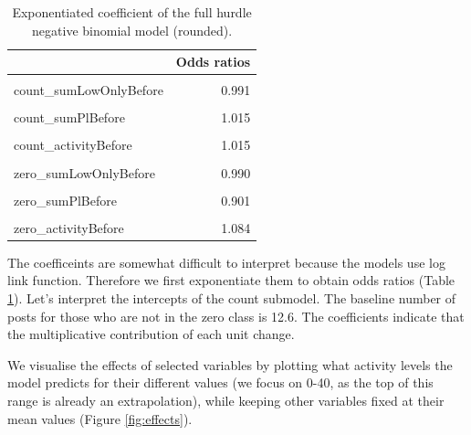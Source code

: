 \documentclass[10pt,dvipsnames]{scrartcl}
\begin{document}
\begin{table}[H]

\begin{table}[H]
\centering\begingroup\fontsize{9}{11}\selectfont

\begin{tabular}{lr}
\toprule
  & Odds ratios\\
\midrule
\cellcolor{gray!6}{count\_(Intercept)} & \cellcolor{gray!6}{12.606}\\
count\_sumLowOnlyBefore & 0.991\\
\cellcolor{gray!6}{count\_sumHighBefore} & \cellcolor{gray!6}{0.992}\\
count\_sumPlBefore & 1.015\\
\cellcolor{gray!6}{count\_sumPhBefore} & \cellcolor{gray!6}{0.870}\\
\addlinespace
count\_activityBefore & 1.015\\
\cellcolor{gray!6}{zero\_(Intercept)} & \cellcolor{gray!6}{1.634}\\
zero\_sumLowOnlyBefore & 0.990\\
\cellcolor{gray!6}{zero\_sumHighBefore} & \cellcolor{gray!6}{0.894}\\
zero\_sumPlBefore & 0.901\\
\addlinespace
\cellcolor{gray!6}{zero\_sumPhBefore} & \cellcolor{gray!6}{1.156}\\
zero\_activityBefore & 1.084\\
\bottomrule
\end{tabular}
\endgroup{}
\end{table}
\caption{Exponentiated coefficient of the full hurdle negative binomial model (rounded).}
\label{tab:exphnb}
\end{table}

The coefficeints are somewhat difficult to interpret because the models
use log link function. Therefore we first exponentiate them to obtain
odds ratios (Table \ref{tab:exphnb}). Let's interpret the intercepts of
the count submodel. The baseline number of posts for those who are not
in the zero class is 12.6. The coefficients indicate that the
multiplicative contribution of each unit change.

We visualise the effects of selected variables by plotting what activity
levels the model predicts for their different values (we focus on 0-40,
as the top of this range is already an extrapolation), while keeping
other variables fixed at their mean values (Figure \ref{fig:effects}).

\footnotesize
\end{document}
